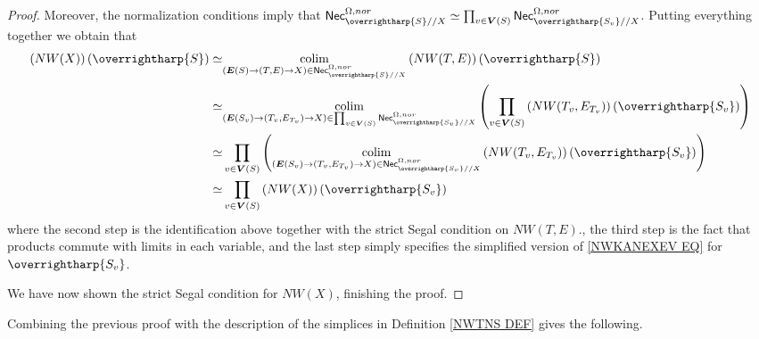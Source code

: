\documentclass[a4paper,10pt
,draft
]{article}%
\numberwithin{equation}{section}
\numberwithin{figure}{section}
\theoremstyle{definition} %
\newcommand{\vect}[1]{\text{\overrightharp{\ensuremath{#1}}}}
\DeclareMathOperator{\colim}{colim}%
\newcommand{\1}{\ensuremath{\mathbbm 1}}%
\begin{document}
\begin{proof}
Moreover, the normalization conditions imply that
$\mathsf{Nec}_{\vect{S}//X}^{\Omega,nor} 
\simeq
\prod_{v \in \boldsymbol{V}(S)}
\mathsf{Nec}_{\vect{S_v}//X}^{\Omega,nor}$.
Putting everything together we obtain that
\begin{equation}
\begin{aligned}
\left(NW(X)\right)(\vect{S}) 
	\simeq &
	\underset{(\boldsymbol{E}(S) \to (T,E) \to X)
	\in \mathsf{Nec}^{\Omega,nor}_{\vect{S}//X}}{\colim}
\left(NW(T,E)\right)(\vect{S})
\\
	\simeq &
\underset{(\boldsymbol{E}(S_v) \to (T_v,E_{T_v}) \to X)
	\in 
	\prod_{v \in \boldsymbol{V}(S)} \mathsf{Nec}^{\Omega,nor}_{\vect{S_v}//X}}{\colim}
	\left(\prod_{v \in \boldsymbol{V}(S)}
	\left(NW(T_v,E_{T_v})\right)(\vect{S_v})\right)
\\
	\simeq &
	\prod_{v \in \boldsymbol{V}(S)}
	\left(
	\underset{(\boldsymbol{E}(S_v) \to (T_v,E_{T_v}) \to X)
	\in \mathsf{Nec}^{\Omega,nor}_{\vect{S_v}//X}}{\colim}
	\left(NW(T_v,E_{T_v})\right)(\vect{S_v})
	\right)
\\
	\simeq &
	\prod_{v \in \boldsymbol{V}(S)} 
	\left(NW(X)\right)(\vect{S_v}) 
\end{aligned}
\end{equation}
where the second step is the identification above together with 
the strict Segal condition on 
$NW(T,E)$.,
the third step is the fact that products commute with limits in each variable, and the last step simply specifies
the simplified version of \eqref{NWKANEXEV EQ}
for $\vect{S_v}$.

We have now shown the 
strict Segal condition for $NW(X)$, 
finishing the proof.
\end{proof}


Combining the previous proof with the description of the simplices 
in Definition \ref{NWTNS DEF} gives the following.
\end{document}
